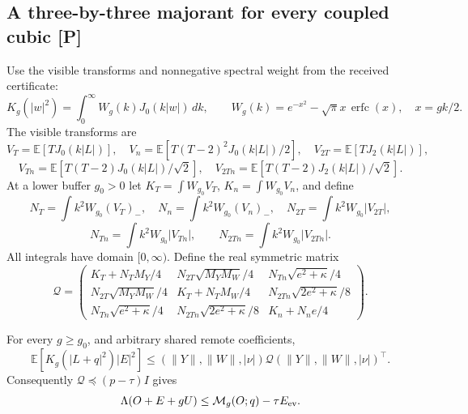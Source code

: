 \subsection{A three-by-three majorant for every coupled cubic [P]}
Use the visible transforms and nonnegative spectral weight from the
received certificate:
\[
 K_g(|w|^2)=\int_0^\infty W_g(k)J_0(k|w|)\,dk,
 \qquad W_g(k)=e^{-x^2}-\sqrt\pi x\,\operatorname{erfc}(x),\quad x=gk/2.
\]
The visible transforms are
\[
 V_T=\mathbb E[TJ_0(k|L|)],\quad
 V_n=\mathbb E[T(T-2)^2J_0(k|L|)/2],\quad
 V_{2T}=\mathbb E[TJ_2(k|L|)],
\]
\[
 V_{Tn}=\mathbb E[T(T-2)J_0(k|L|)/\sqrt2],\quad
 V_{2Tn}=\mathbb E[T(T-2)J_2(k|L|)/\sqrt2].
\]
At a lower buffer $g_0>0$ let $K_T=\int W_{g_0}V_T$,
$K_n=\int W_{g_0}V_n$, and define
\[
 N_T=\int k^2W_{g_0}(V_T)_-,\quad
 N_n=\int k^2W_{g_0}(V_n)_-,\quad
 N_{2T}=\int k^2W_{g_0}|V_{2T}|,
\]
\[
 N_{Tn}=\int k^2W_{g_0}|V_{Tn}|,\qquad
 N_{2Tn}=\int k^2W_{g_0}|V_{2Tn}|.
\]
All integrals have domain $[0,\infty)$.
Define the real symmetric matrix
\[
 \mathcal Q=
 \begin{pmatrix}
 K_T+N_TM_Y/4&N_{2T}\sqrt{M_YM_W}/4&N_{Tn}\sqrt{e^2+\kappa}/4\\
 N_{2T}\sqrt{M_YM_W}/4&K_T+N_TM_W/4&N_{2Tn}\sqrt{2e^2+\kappa}/8\\
 N_{Tn}\sqrt{e^2+\kappa}/4&N_{2Tn}\sqrt{2e^2+\kappa}/8&K_n+N_ne/4
 \end{pmatrix}.
\]

\begin{theorem}
For every $g\ge g_0$, and arbitrary shared remote coefficients,
\[
 \mathbb E[K_g(|L+q|^2)|E|^2]
 \le (\|Y\|,\|W\|,|\nu|)\mathcal Q
                  (\|Y\|,\|W\|,|\nu|)^\top.
\]
Consequently $\mathcal Q\preceq(p-\tau)I$ gives
\[
 \Lambda(O+E+gU)\le\mathcal M_g(O;q)-\tau E_{\rm ev}.
\]
\end{theorem}

